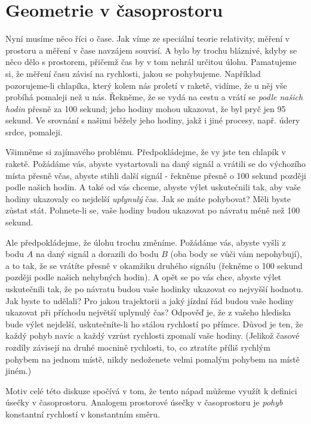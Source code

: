   \section{Geometrie v časoprostoru}\label{fyz:IIchapXLIIsecIV}
    Nyní musíme něco říci o čase. Jak víme ze speciální teorie relativity, měření v prostoru a 
    měření v čase navzájem souvisí. A bylo by trochu bláznivé, kdyby se něco dělo s prostorem, 
    přičemž čas by v tom nehrál určitou úlohu. Pamatujeme si, že měření času závisí na rychlosti, 
    jakou se pohybujeme. Například pozorujeme-li chlapíka, který kolem nás proletí v raketě, 
    vidíme, že u něj vše probíhá pomaleji než u nás. Řekněme, že se vydá na cestu a vrátí se 
    \emph{podle našich hodin} přesně za \num{100} sekund; jeho hodiny mohou ukazovat, že byl pryč 
    jen \num{95} sekund. Ve srovnání s našimi běžely jeho hodiny, jakž i jiné procesy, např. údery 
    srdce, pomaleji.
    
    Všimněme si zajímavého problému. Předpokládejme, že vy jste ten chlapík v raketě. Požádáme vás, 
    abyste vystartovali na daný signál a vrátili se do výchozího místa přesně včas, abyste stihli 
    další signál - řekněme přesně o 100 sekund později podle našich hodin. A také od vás chceme, 
    abyste výlet uskutečnili tak, aby vaše hodiny ukazovaly co nejdelší \emph{uplynulý} čas. Jak se 
    máte pohybovat? Měli byste zůstat stát. Pohnete-li se, vaše hodiny budou ukazovat po návratu 
    méně než \num{100} sekund. 
    
    Ale předpokládejme, že úlohu trochu změníme. Požádáme vás, abyste vyšli z bodu \(A\) na daný 
    signál a dorazili do bodu \(B\) (oba body se vůči vám nepohybují), a to tak, že se vrátíte 
    přesně v okamžiku druhého signálu (řekněme o \num{100} sekund později podle našich nehybných 
    hodin). A opět se po vás chce, abyste výlet uskutečnili tak, že po návratu budou vaše hodinky 
    ukazovat co nejvyšší hodnotu. Jak byste to udělali? Pro jakou trajektorii a jaký jízdní řád 
    budou vaše hodiny ukazovat při příchodu největší uplynulý čas? Odpověď je, že z vašeho hlediska 
    bude výlet nejdelší, uskutečníte-li ho stálou rychlostí po přímce. Důvod je ten, že každý pohyb 
    navíc a každý vzrůst rychlosti zpomalí vaše hodiny. (Jelikož časové rozdíly závisejí na druhé 
    mocnině rychlosti, to, co ztratíte příliš rychlým pohybem na jednom místě, nikdy nedoženete 
    velmi pomalým pohybem na místě jiném.)
     
    Motiv celé této diskuze spočívá v tom, že tento nápad můžeme využít k definici úsečky v 
    časoprostoru. Analogem prostorové úsečky v časoprostoru je \emph{pohyb} konstantní rychlostí v 
    konstantním směru. 
    
